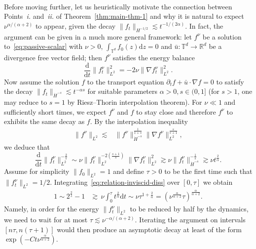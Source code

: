 \documentclass[11pt,oneside,reqno]{amsart}
\newcommand{\mathd}{\mathrm{d}}
\newcommand{\tmtextit}[1]{{{\itshape{#1}}}}
\numberwithin{equation}{section}
\begin{document}
\

Before moving further, let us heuristically motivate the connection between
Points~\tmtextit{i.} and~\tmtextit{ii.} of Theorem~\ref{thm:main-thm-1} and
why it is natural to expect $\nu^{\alpha / (\alpha + 2)}$ to appear, given the
decay $\| f_t \|_{H^{- 1 / 2}} \lesssim t^{- 1 / (2 \alpha)}$. In fact, the
argument can be given in a much more general framework: let $f^{\nu}$ be a
solution to~\eqref{eq:passive-scalar} with $\nu > 0$, $\int_{\mathbb{T}^d} f_0
(z) \mathd z = 0$ and $\bar{u} : \mathbb{T}^d \rightarrow \mathbb{R}^d$ be a
divergence free vector field; then $f^{\nu}$ satisfies the energy balance
\[ \frac{\mathd}{\mathd t} \| f^{\nu}_t \|_{L^2}^2 = - 2 \nu \| \nabla
   f^{\nu}_t \|_{L^2}^2 . \]
Now assume the solution $f$ to the transport equation $\partial_t f + \bar{u}
\cdot \nabla f = 0$ to satisfy the decay $\| f_t \|_{\dot{H}^{- s}} \lesssim
t^{- \alpha s}$ for suitable parameters $\alpha > 0, s \in (0, 1]$ (for $s >
1$, one may reduce to $s = 1$ by Riesz--Thorin interpolation theorem). For
$\nu \ll 1$ and sufficiently short times, we expect $f^{\nu}$ and $f$ to stay
close and therefore $f^{\nu}$ to exhibits the same decay as $f$. By the
interpolation inequality
%
\begin{align*}
  \| f^\nu \|_{L^2} \lesssim & \| f^\nu \|_{\dot{H}^{- s}}^{\frac{1}{1 + s}}  \|
  \nabla f^\nu \|_{L^2}^{\frac{s}{s + 1}},
\end{align*}
%
we deduce that
\begin{equation}
  \frac{\mathd}{\mathd t} \| f^{\nu}_t \|_{L^2}^{- \frac{2}{s}} \sim \nu \|
  f^{\nu}_t \|_{L^2}^{- 2 \left( \frac{s + 1}{s} \right)} \| \nabla f^{\nu}_t
  \|_{L^2}^2 \gtrsim \nu \| f^{\nu}_t \|_{\dot{H}^{- s}}^{- \frac{1}{s}}
  \gtrsim \nu t^{\frac{2}{\alpha}} . \label{eq:relation-inviscid-diss}
\end{equation}
Assume for simplicity $\| f_0 \|_{L^2} = 1$ and define $\tau > 0$ to be the
first time such that $\| f^{\nu}_t \|_{L^2} = 1 / 2$.
Integrating~\eqref{eq:relation-inviscid-diss} over $[0, \tau]$ we obtain
%
\begin{align*}
  1 \sim 2^{\frac{2}{s}} - 1 & \gtrsim \, \nu \int_0^{\tau}
  t^{\frac{2}{\alpha}} \mathd t \sim \nu \tau^{1 + \frac{2}{\alpha}} = \left(
  \nu^{\frac{\alpha}{\alpha + 2}} \tau \right)^{\frac{\alpha}{\alpha + 2}} .
\end{align*}
%
Namely, in order for the energy $\| f^{\nu}_t \|_{L^2}$ to be reduced by half
by the dynamics, we need to wait for at most $\tau \lesssim \nu^{- \alpha /
(\alpha + 2)}$. Iterating the argument on intervals $[n \tau, n (\tau + 1)]$
would then produce an asymptotic decay at least of the form $\exp (- C t
\nu^{\frac{\alpha}{\alpha + 2}})$.
\end{document}
